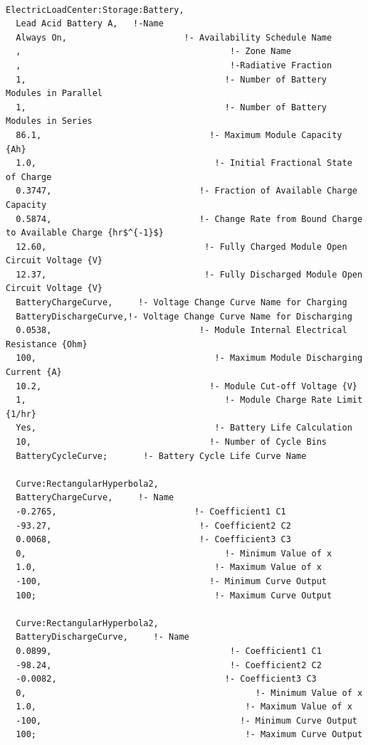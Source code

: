 \begin{lstlisting}

ElectricLoadCenter:Storage:Battery,
  Lead Acid Battery A,   !-Name
  Always On,                       !- Availability Schedule Name
  ,                                         !- Zone Name
  ,                                         !-Radiative Fraction
  1,                                       !- Number of Battery Modules in Parallel
  1,                                       !- Number of Battery Modules in Series
  86.1,                                 !- Maximum Module Capacity {Ah}
  1.0,                                   !- Initial Fractional State of Charge
  0.3747,                             !- Fraction of Available Charge Capacity
  0.5874,                             !- Change Rate from Bound Charge to Available Charge {hr$^{-1}$}
  12.60,                               !- Fully Charged Module Open Circuit Voltage {V}
  12.37,                               !- Fully Discharged Module Open Circuit Voltage {V}
  BatteryChargeCurve,     !- Voltage Change Curve Name for Charging
  BatteryDischargeCurve,!- Voltage Change Curve Name for Discharging
  0.0538,                             !- Module Internal Electrical Resistance {Ohm}
  100,                                   !- Maximum Module Discharging Current {A}
  10.2,                                 !- Module Cut-off Voltage {V}
  1,                                       !- Module Charge Rate Limit {1/hr}
  Yes,                                   !- Battery Life Calculation
  10,                                   !- Number of Cycle Bins
  BatteryCycleCurve;       !- Battery Cycle Life Curve Name

  Curve:RectangularHyperbola2,
  BatteryChargeCurve,     !- Name
  -0.2765,                           !- Coefficient1 C1
  -93.27,                             !- Coefficient2 C2
  0.0068,                             !- Coefficient3 C3
  0,                                       !- Minimum Value of x
  1.0,                                   !- Maximum Value of x
  -100,                                 !- Minimum Curve Output
  100;                                   !- Maximum Curve Output

  Curve:RectangularHyperbola2,
  BatteryDischargeCurve,     !- Name
  0.0899,                                   !- Coefficient1 C1
  -98.24,                                   !- Coefficient2 C2
  -0.0082,                                 !- Coefficient3 C3
  0,                                             !- Minimum Value of x
  1.0,                                         !- Maximum Value of x
  -100,                                       !- Minimum Curve Output
  100;                                         !- Maximum Curve Output


\end{lstlisting}
